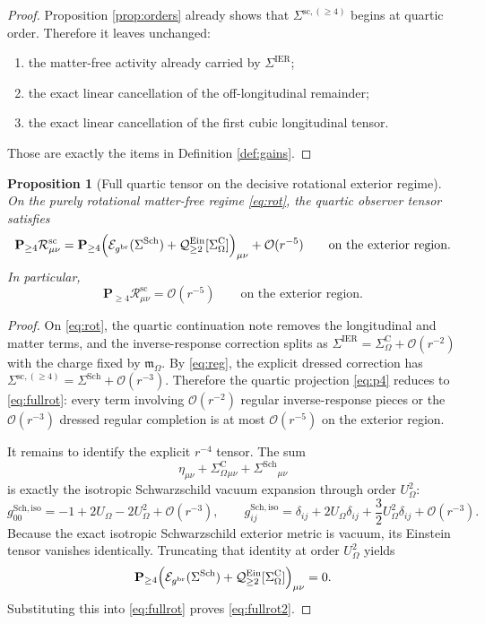 \documentclass[11pt]{article}
\newcommand{\ReBridge}{g^{\mathrm{br}}}
\newcommand{\SigmaIER}{\Sigma^{\mathrm{IER}}}
\newcommand{\SigmaSRFourSC}{\Sigma^{\mathrm{sc},(\ge 4)}}
\newcommand{\SigmaDressSch}{\Sigma^{\mathrm{Sch}}}
\newcommand{\SigmaCOmega}{\Sigma^{\mathrm C}_{\Omega}}
\newcommand{\EinLin}{\mathcal E_{\ReBridge}}
\newcommand{\EinQuad}{\mathcal Q_{\ge 2}^{\mathrm{Ein}}}
\newcommand{\Pfour}{\mathbf P_{\ge 4}}
\newcommand{\HamChargeOmega}{\mathfrak m_{\Omega}}
\newtheorem{proposition}{Proposition}
\begin{document}
\begin{proof}
Proposition \ref{prop:orders} already shows that \(\SigmaSRFourSC\) begins at quartic order. Therefore it leaves unchanged:
\begin{enumerate}
    \item the matter-free activity already carried by \(\SigmaIER\);
    \item the exact linear cancellation of the off-longitudinal remainder;
    \item the exact linear cancellation of the first cubic longitudinal tensor.
\end{enumerate}
Those are exactly the items in Definition \ref{def:gains}.
\end{proof}

\begin{proposition}[Full quartic tensor on the decisive rotational exterior regime]
\label{prop:fullrot}
On the purely rotational matter-free regime \eqref{eq:rot}, the quartic observer tensor satisfies
\begin{equation}
\Pfour \mathcal R_{\mu\nu}^{\mathrm{sc}}
=
\Pfour\Bigl(\EinLin(\SigmaDressSch)+\EinQuad[\SigmaCOmega]\Bigr)_{\mu\nu}
+\mathcal O(r^{-5})
\qquad
\text{on the exterior region}.
\label{eq:fullrot}
\end{equation}
In particular,
\begin{equation}
\Pfour \mathcal R_{\mu\nu}^{\mathrm{sc}}
=
\mathcal O(r^{-5})
\qquad
\text{on the exterior region}.
\label{eq:fullrot2}
\end{equation}
\end{proposition}

\begin{proof}
On \eqref{eq:rot}, the quartic continuation note removes the longitudinal and matter terms, and the inverse-response correction splits as \(\SigmaIER=\SigmaCOmega+\mathcal O(r^{-2})\) with the charge fixed by \(\HamChargeOmega\). By \eqref{eq:reg}, the explicit dressed correction has \(\SigmaSRFourSC=\SigmaDressSch+\mathcal O(r^{-3})\). Therefore the quartic projection \eqref{eq:p4} reduces to \eqref{eq:fullrot}: every term involving \(\mathcal O(r^{-2})\) regular inverse-response pieces or the \(\mathcal O(r^{-3})\) dressed regular completion is at most \(\mathcal O(r^{-5})\) on the exterior region.

It remains to identify the explicit \(r^{-4}\) tensor. The sum
\[
\eta_{\mu\nu}
+\SigmaCOmega{}_{\mu\nu}
+\SigmaDressSch{}_{\mu\nu}
\]
is exactly the isotropic Schwarzschild vacuum expansion through order \(U_\Omega^2\):
\[
g_{00}^{\mathrm{Sch,iso}}
=
-1+2U_\Omega-2U_\Omega^2+\mathcal O(r^{-3}),
\qquad
g_{ij}^{\mathrm{Sch,iso}}
=
\delta_{ij}+2U_\Omega\delta_{ij}+\frac32U_\Omega^2\delta_{ij}+\mathcal O(r^{-3}).
\]
Because the exact isotropic Schwarzschild exterior metric is vacuum, its Einstein tensor vanishes identically. Truncating that identity at order \(U_\Omega^2\) yields
\[
\Pfour\Bigl(\EinLin(\SigmaDressSch)+\EinQuad[\SigmaCOmega]\Bigr)_{\mu\nu}=0.
\]
Substituting this into \eqref{eq:fullrot} proves \eqref{eq:fullrot2}.
\end{proof}
\end{document}
